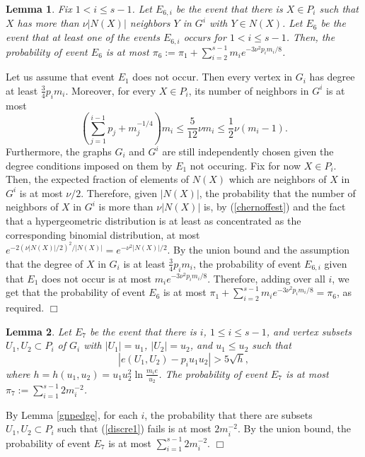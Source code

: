 \documentclass[11pt]{article}
\newtheorem{lemma}{Lemma}[section]
\newenvironment{proof}
      {\medskip\noindent{\bf Proof:}\hspace{1mm}}
      {\hfill$\Box$\medskip}
\begin{document}
\begin{lemma}\label{E4}
Fix $1 < i \leq s-1$. Let $E_{6,i}$ be the event that there
is $X \in P_i$ such that $X$ has more than  $\nu|N(X)|$ neighbors $Y$ in $G^i$
with $Y \in N(X)$. Let $E_6$ be the event that at least
one of the events $E_{6,i}$ occurs for $1 < i \leq s-1$. Then, the probability
of event $E_6$ is at most $\pi_6 := \pi_1 + \sum_{i=2}^{s-1} m_ie^{-3\nu^2 p_i m_i/8}$.
\end{lemma}
\begin{proof} Let us assume that event $E_1$ does not occur. Then every vertex in $G_i$ has degree at least $\frac{3}{4}p_i m_i$. Moreover, for every $X \in P_i$, its number of neighbors in $G^i$ is at most
\[\left(\sum_{j=1}^{i-1} p_j + m_j^{-1/4}\right)m_i \leq \frac{5}{12} \nu m_i \leq \frac{1}{2} \nu (m_i - 1).\]
Furthermore, the graphs $G_i$ and $G^i$ are still independently chosen given the degree conditions imposed on them by $E_1$ not occuring. Fix for now $X \in P_i$. Then, the expected fraction of elements of $N(X)$
which are neighbors of $X$ in $G^i$ is at most $\nu/2$. Therefore, given
$|N(X)|$, the probability that the number of neighbors of $X$ in $G^i$ is more
than $\nu |N(X)|$ is, by (\ref{chernoffest}) and the fact that a hypergeometric
distribution is at least as concentrated as the corresponding binomial
distribution, at most
$e^{-2\left(\nu|N(X)|/2\right)^2/|N(X)|} = e^{-\nu^2|N(X)|/2}$. 
By the union bound and the assumption that the degree of $X$ in $G_i$ is at least $\frac{3}{4} p_i m_i$, the probability of event $E_{6,i}$ given that $E_1$ does not occur is at most $m_ie^{-3\nu^2 p_i m_i/8}$. Therefore, adding over all $i$, we get that the probability of event $E_6$ is at most $\pi_1 + \sum_{i=2}^{s-1} m_ie^{-3\nu^2 p_i m_i/8} = \pi_6$, as required.
\end{proof}

\begin{lemma}\label{E5}
Let $E_7$ be the event that there is $i$, $1 \leq i \leq s-1$, and vertex
subsets $U_1,U_2 \subset P_i$ of $G_i$ with $|U_1|=u_1$, $|U_2|=u_2$, and $u_1
\leq u_2$ such that
\begin{equation}\label{discre1} |e(U_1,U_2)-p_iu_1u_2| >5\sqrt{h},\end{equation}
where  $h=h(u_1,u_2)=u_1u_2^2\ln \frac{m_ie}{u_2}$. The probability of event
$E_7$ is at most
$\pi_7:=\sum_{i=1}^{s-1} 2m_i^{-2}$.
\end{lemma}
\begin{proof}
By Lemma \ref{gnpedge}, for each $i$, the probability that there are subsets
$U_1,U_2 \subset P_i$ such that (\ref{discre1}) fails is at most $2m_i^{-2}$.
By
the union bound, the probability of event $E_7$ is at most $\sum_{i=1}^{s-1}
2m_i^{-2}$.
\end{proof}
\end{document}
